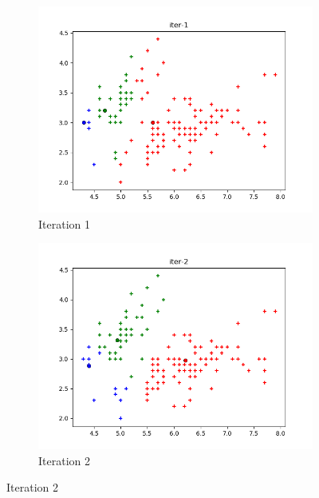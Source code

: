 \documentclass[french]{article}
\begin{document}
\begin{figure}[h!]
\centering
\begin{subfigure}{.5\textwidth}
  \centering
  \includegraphics[width=\linewidth]{img/iter-1.png}
  \caption{Iteration 1}
\end{subfigure}%
\begin{subfigure}{.5\textwidth}
  \centering
  \includegraphics[width=\linewidth]{img/iter-2.png}
  \caption{Iteration 2}
\end{subfigure}%
\end{figure}
\end{document}
